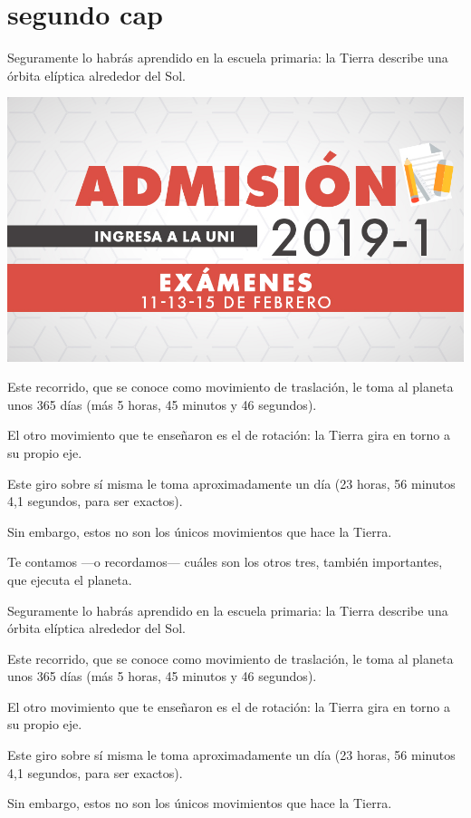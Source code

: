 \chapter{segundo cap}
	
Seguramente lo habrás aprendido en la escuela primaria: la Tierra describe una órbita elíptica alrededor del Sol.

\includegraphics[scale=0.5]{exa}

Este recorrido, que se conoce como movimiento de traslación, le toma al planeta unos 365 días 
(más 5 horas, 45 minutos y 46 segundos).

El otro movimiento que te enseñaron es el de rotación: la Tierra gira en torno a su propio eje.

Este giro sobre sí misma le toma aproximadamente un día (23 horas, 56 minutos 4,1 segundos, para ser exactos). 

Sin embargo, estos no son los únicos movimientos que hace la Tierra.

Te contamos —o recordamos— cuáles son los otros tres, también importantes, que ejecuta el planeta.
	
Seguramente lo habrás aprendido en la escuela primaria: la Tierra describe una órbita elíptica alrededor del Sol.

Este recorrido, que se conoce como movimiento de traslación, le toma al planeta unos 365 días 
(más 5 horas, 45 minutos y 46 segundos).

El otro movimiento que te enseñaron es el de rotación: la Tierra gira en torno a su propio eje.

Este giro sobre sí misma le toma aproximadamente un día (23 horas, 56 minutos 4,1 segundos, para ser exactos). 

Sin embargo, estos no son los únicos movimientos que hace la Tierra.


